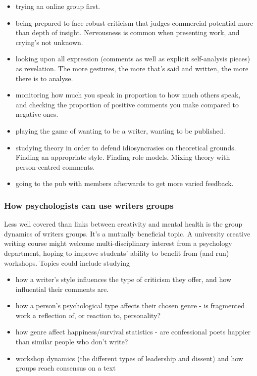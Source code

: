 \documentclass[11pt]{article}
\begin{document}
\begin{itemize}
\item trying an online group first. 
\item being prepared to face robust criticism that judges commercial potential more than depth of insight. Nervousness is common when presenting work, and crying's not unknown. 
\item looking upon all expression (comments as well as explicit self-analysis pieces) as revelation. The more gestures, the more that's said and   written, the more there is to analyse. 
\item monitoring how much you speak in proportion to how much others speak, and checking the proportion of positive comments you make compared to negative ones.
\item playing the game of wanting to be a writer, wanting to be published. 
\item studying theory in order to defend idiosyncrasies on theoretical grounds. Finding an appropriate style. Finding role models. Mixing theory with person-centred comments. 
\item going to the pub with members afterwards to get more varied feedback.
\end{itemize}

\subsubsection*{How psychologists can use writers groups}

 Less well covered than links between creativity and mental health is the group dynamics of writers groups. It's a mutually beneficial topic. A university creative writing course might
welcome multi-disciplinary interest from a psychology department, hoping to improve students' ability to benefit from (and run) workshops. Topics could include studying 

\begin{itemize}
\item  how a writer's style influences the type of criticism they offer, and how
  influential their comments are.
\item  how a person's psychological type affects their chosen genre - is fragmented work a reflection of, or reaction to, personality? 
\item  how genre affect happiness/survival statistics - are confessional poets
happier than similar people who don't write? 
\item  workshop dynamics (the different types of leadership and dissent) and how groups reach consensus  on a text
\end{itemize}
\end{document}
